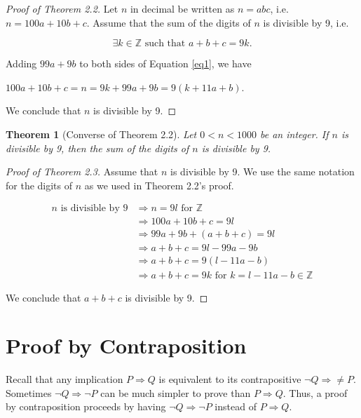 \documentclass[12pt,a4paper]{article}
\newtheorem{theorem}{Theorem}[section]
\theoremstyle{definition}
\begin{document}
\begin{proof}[Proof of Theorem 2.2]
Let $n$ in decimal be written as $n=abc$, i.e. $n=100a+10b+c$. Assume that the sum of the digits of $n$ is divisible by 9, i.e.

\begin{equation}\label{eq1}
\exists k\in\mathbb{Z}\text{ such that }a+b+c=9k.
\end{equation}

Adding $99a+9b$ to both sides of Equation \eqref{eq1}, we have

\begin{center}
$100a+10b+c=n=9k+99a+9b=9(k+11a+b)$.
\end{center}

We conclude that $n$ is divisible by 9.
\end{proof}

\begin{theorem}[Converse of Theorem 2.2]\label{thm2.3}
Let $0<n<1000$ be an integer. If $n$ is divisible by 9, then the sum of the digits of $n$ is divisible by 9.
\end{theorem}

\begin{proof}[Proof of Theorem 2.3]
Assume that $n$ is divisible by 9. We use the same notation for the digits of $n$ as we used in Theorem 2.2's proof.
\begin{center}
	\begin{align*}
		n \text{ is divisible by 9}&\Rightarrow n=9l \text{ for } \mathbb{Z} \\
		&\Rightarrow 100a+10b+c=9l \\
		&\Rightarrow 99a+9b+(a+b+c)=9l \\
		&\Rightarrow a+b+c=9l-99a-9b \\
		&\Rightarrow a+b+c=9(l-11a-b) \\
		&\Rightarrow a+b+c=9k \text{ for } k=l-11a-b\in\mathbb{Z}
	\end{align*}
\end{center}
We conclude that $a+b+c$ is divisible by 9.
\end{proof}

\newpage

\section*{Proof by Contraposition}

Recall that any implication $P\Rightarrow Q$ is equivalent to its contrapositive $\neg Q\Rightarrow\neq P$. Sometimes $\neg Q\Rightarrow \neg P$ can be much simpler to prove than $P\Rightarrow Q$. Thus, a proof by contraposition proceeds by having $\neg Q\Rightarrow \neg P$ instead of $P \Rightarrow Q$.
\end{document}
